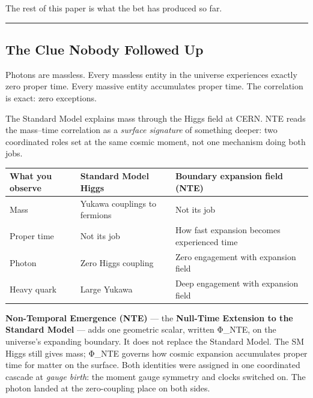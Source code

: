 \documentclass[
  11pt,
]{article}
\newcounter{none} %
\begin{document}
The rest of this paper is what the bet has produced so far.

\begin{center}\rule{0.5\linewidth}{0.5pt}\end{center}

\subsection{The Clue Nobody Followed
Up}\label{the-clue-nobody-followed-up}

Photons are massless. Every massless entity in the universe experiences
exactly zero proper time. Every massive entity accumulates proper time.
The correlation is exact: zero exceptions.

The Standard Model explains mass through the Higgs field at CERN. NTE
reads the mass--time correlation as a \emph{surface signature} of
something deeper: two coordinated roles set at the same cosmic moment,
not one mechanism doing both jobs.

{\def\LTcaptype{none} %
\begin{longtable}[]{@{}
  >{\raggedright\arraybackslash}p{}
  >{\raggedright\arraybackslash}p{}
  >{\raggedright\arraybackslash}p{}@{}}
\toprule\noalign{}
\begin{minipage}[b]{\linewidth}\raggedright
What you observe
\end{minipage} & \begin{minipage}[b]{\linewidth}\raggedright
Standard Model Higgs
\end{minipage} & \begin{minipage}[b]{\linewidth}\raggedright
Boundary expansion field (NTE)
\end{minipage} \\
\midrule\noalign{}
\endhead
\bottomrule\noalign{}
\endlastfoot
Mass & Yukawa couplings to fermions & Not its job \\
Proper time & Not its job & How fast expansion becomes experienced
time \\
Photon & Zero Higgs coupling & Zero engagement with expansion field \\
Heavy quark & Large Yukawa & Deep engagement with expansion field \\
\end{longtable}
}

\textbf{Non-Temporal Emergence (NTE)} --- the \textbf{Null-Time
Extension to the Standard Model} --- adds one geometric scalar, written
\textbar Φ\_NTE\textbar, on the universe's expanding boundary. It does
not replace the Standard Model. The SM Higgs still gives mass;
\textbar Φ\_NTE\textbar{} governs how cosmic expansion accumulates
proper time for matter on the surface. Both identities were assigned in
one coordinated cascade at \emph{gauge birth}: the moment gauge symmetry
and clocks switched on. The photon landed at the zero-coupling place on
both sides.
\end{document}
